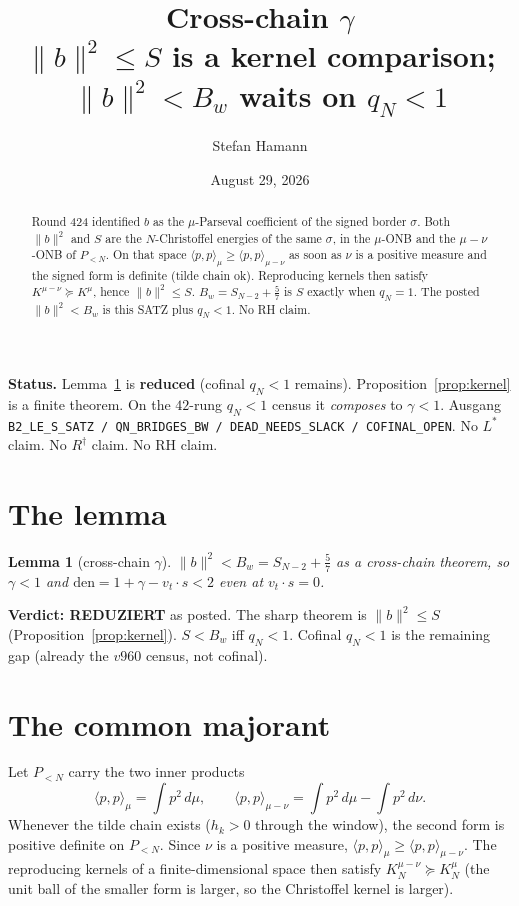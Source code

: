 \documentclass[11pt]{article}
\title{\bfseries Cross-chain $\gamma$\\[2mm]
\large $\|b\|^2\le S$ is a kernel comparison;
$\|b\|^2<B_w$ waits on $q_N<1$}
\author{Stefan Hamann}
\date{August 29, 2026}
\newtheorem{lemma}{Lemma}
\theoremstyle{remark}
\begin{document}
\maketitle

\begin{abstract}\noindent
Round 424 identified $b$ as the $\mu$-Parseval
coefficient of the signed border $\sigma$.
Both $\|b\|^2$ and $S$ are the $N$-Christoffel
energies of the same $\sigma$, in the
$\mu$-ONB and the $\mu-\nu$-ONB of
$P_{<N}$.
On that space
$\langle p,p\rangle_\mu\ge\langle p,p\rangle_{\mu-\nu}$
as soon as $\nu$ is a positive measure and the
signed form is definite (tilde chain ok).
Reproducing kernels then satisfy
$K^{\mu-\nu}\succeq K^\mu$, hence
$\|b\|^2\le S$.
$B_w=S_{N-2}+\tfrac57$ is $S$ exactly when
$q_N=1$.
The posted $\|b\|^2<B_w$ is this SATZ plus
$q_N<1$.
No RH claim.
\end{abstract}

\medskip\noindent
\textbf{Status.}\enspace
Lemma~\ref{lem:cross} is \textbf{reduced}
(cofinal $q_N<1$ remains).
Proposition~\ref{prop:kernel} is a finite theorem.
On the $42$-rung $q_N<1$ census it
\emph{composes} to $\gamma<1$.
Ausgang \texttt{B2\_LE\_S\_SATZ / QN\_BRIDGES\_BW / DEAD\_NEEDS\_SLACK / COFINAL\_OPEN}.
No $L^{*}$ claim.  No $R^{\dagger}$ claim.  No RH claim.

\section{The lemma}\label{sec:lem}

\begin{lemma}[cross-chain $\gamma$]\label{lem:cross}
$\|b\|^2<B_w=S_{N-2}+\tfrac57$ as a
cross-chain theorem, so $\gamma<1$ and
$\mathrm{den}=1+\gamma-v_t\cdot s<2$
even at $v_t\cdot s=0$.
\end{lemma}

\noindent
\textbf{Verdict: REDUZIERT} as posted.
The sharp theorem is $\|b\|^2\le S$
(Proposition~\ref{prop:kernel}).
$S<B_w$ iff $q_N<1$.
Cofinal $q_N<1$ is the remaining gap
(already the $v960$ census, not cofinal).

\section{The common majorant}\label{sec:maj}

Let $P_{<N}$ carry the two inner products
\[
  \langle p,p\rangle_\mu=\int p^2\,d\mu,\qquad
  \langle p,p\rangle_{\mu-\nu}
  =\int p^2\,d\mu-\int p^2\,d\nu.
\]
Whenever the tilde chain exists
($h_k>0$ through the window),
the second form is positive definite on
$P_{<N}$.
Since $\nu$ is a positive measure,
$\langle p,p\rangle_\mu\ge\langle p,p\rangle_{\mu-\nu}$.
The reproducing kernels of a finite-dimensional
space then satisfy
$K_N^{\mu-\nu}\succeq K_N^\mu$
(the unit ball of the smaller form is larger,
so the Christoffel kernel is larger).
\end{document}
